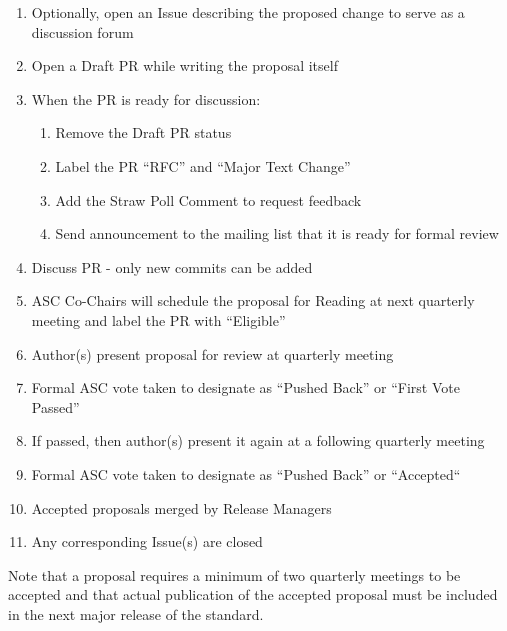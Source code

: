 \documentclass{article}
\providecommand{\tightlist}{%
  \setlength{\itemsep}{0pt}\setlength{\parskip}{0pt}}
\begin{document}
\begin{enumerate}
\def\labelenumi{\arabic{enumi}.}
\tightlist
\item
  Optionally, open an Issue describing the proposed change to serve as a discussion
  forum
\item
  Open a Draft PR while writing the proposal itself
\item
  When the PR is ready for discussion:
  \begin{enumerate}
  \def\labelenumi{\arabic{enumi}.}
  \tightlist
  \item 
    Remove the Draft PR status
  \item
    Label the PR ``RFC'' and ``Major Text Change''
  \item
    Add the Straw Poll Comment to request feedback
  \item
    Send announcement to the mailing list that it is ready for formal review
  \end{enumerate}
\item
  Discuss PR - only new commits can be added
\item
  ASC Co-Chairs will schedule the proposal for Reading at next quarterly
  meeting and label the PR with ``Eligible''
\item
  Author(s) present proposal for review at quarterly meeting
\item
  Formal ASC vote taken to designate as ``Pushed Back'' or ``First Vote Passed''
\item
  If passed, then author(s) present it again at a following quarterly meeting
\item
  Formal ASC vote taken to designate as ``Pushed Back'' or ``Accepted``
\item
  Accepted proposals merged by Release Managers
\item
  Any corresponding Issue(s) are closed
\end{enumerate}

Note that a proposal requires a minimum of two quarterly meetings to be
accepted and that actual publication of the accepted proposal must be
included in the next major release of the standard.
\end{document}
